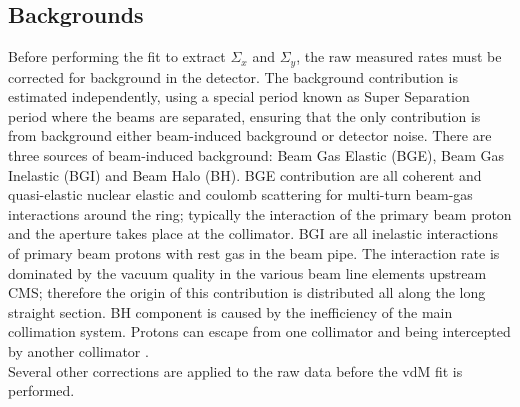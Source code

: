 






\subsection*{Backgrounds}
Before performing the fit to extract $\Sigma_{x}$ and $\Sigma_{y}$, the raw measured rates must be corrected for background in the detector. The background contribution is estimated independently, using a special period known as Super Separation period where the beams are separated, ensuring that the only contribution is from background either beam-induced background or detector noise. There are three sources of beam-induced background: Beam Gas Elastic (BGE), Beam Gas Inelastic (BGI) and Beam Halo (BH). BGE contribution are all coherent and quasi-elastic nuclear elastic and coulomb scattering for multi-turn beam-gas interactions around the ring; typically the interaction of the primary beam proton and the aperture takes place at the collimator. BGI  are all inelastic interactions of primary beam protons with rest gas in the beam pipe. The interaction rate is dominated by the vacuum quality in the various beam line elements upstream CMS; therefore the origin of this contribution is distributed all along the long straight section. BH component is caused by the inefficiency of the main collimation system. Protons can escape from one collimator and being intercepted by another collimator \cite{bkg_source}.\\
Several other corrections are applied to the raw data before the vdM fit is performed.\\

